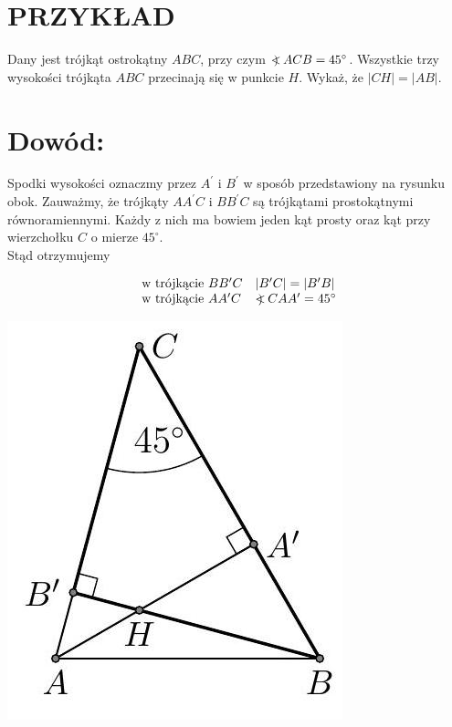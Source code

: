 \documentclass[10pt]{article}
\newcommand\Varangle{\mathop{{<\!\!\!\!\!\text{\small)}}\:}\nolimits}
\begin{document}
\section*{PRZYKŁAD}
Dany jest trójkąt ostrokątny \(A B C\), przy czym \(\Varangle A C B=45^{\circ}\). Wszystkie trzy wysokości trójkąta \(A B C\) przecinają się w punkcie \(H\). Wykaż, że \(|C H|=|A B|\).

\section*{Dowód:}
Spodki wysokości oznaczmy przez \(A^{\prime}\) i \(B^{\prime}\) w sposób przedstawiony na rysunku obok. Zauważmy, że trójkąty \(A A^{\prime} C\) i \(B B^{\prime} C\) są trójkątami prostokątnymi równoramiennymi. Każdy z nich ma bowiem jeden kąt prosty oraz kąt przy wierzchołku \(C\) o mierze \(45^{\circ}\).\\
Stąd otrzymujemy

\[
\begin{array}{ll}
\text { w trójkącie } B B^{\prime} C & \left|B^{\prime} C\right|=\left|B^{\prime} B\right| \\
\text { w trójkącie } A A^{\prime} C & \Varangle C A A^{\prime}=45^{\circ}
\end{array}
\]

\begin{center}
\includegraphics[max width=\textwidth]{2024_11_21_71f62bd117d375398909g-055}
\end{center}
\end{document}
